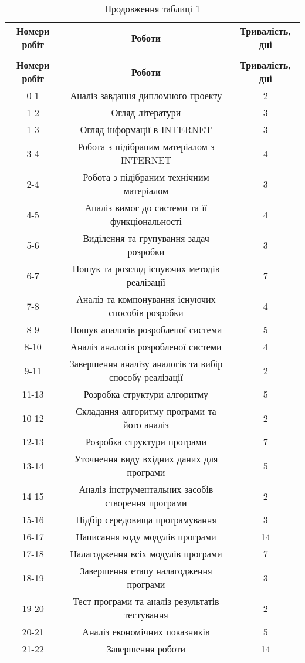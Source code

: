 \begin{center}\footnotesize
\begin{longtable}{|c|c|c|}
\captionsetup{justification=centering}
\caption{Роботи мережевого графа}\label{t:eco_2}\\
\hline
\multicolumn{1}{|c|}{\textbf{Номери робіт}}&
\multicolumn{1}{c|}{\textbf{Роботи}}&
\multicolumn{1}{c|}{\textbf{Тривалість, \newline дні}}\\\hline

\endfirsthead
\caption*{\hfill Продовження таблиці \ref{t:eco_2}}\\\hline

\multicolumn{1}{|c|}{\textbf{Номери робіт}}&
\multicolumn{1}{c|}{\textbf{Роботи}}&
\multicolumn{1}{c|}{\textbf{Тривалість, дні}}\\\hline
\endhead

0-1 & Аналіз завдання дипломного проекту & 2\\ \hline
1-2 & Огляд літератури & 3\\ \hline
1-3 & Огляд інформації в INTERNET & 3\\ \hline
3-4 & Робота з підібраним матеріалом з INTERNET & 4\\ \hline
2-4 & Робота з підібраним технічним матеріалом & 3\\ \hline
4-5 & Аналіз вимог до системи та її функціональності & 4\\ \hline
5-6 & Виділення та групування задач розробки & 3\\ \hline
6-7 & Пошук та розгляд існуючих методів реалізації & 7\\ \hline
7-8 & Аналіз та компонування існуючих способів розробки & 4\\ \hline
8-9 & Пошук аналогів розробленої системи & 5\\ \hline
8-10 & Аналіз аналогів розробленої системи & 4\\ \hline
9-11 & Завершення аналізу аналогів та вибір способу реалізації & 2\\ \hline
11-13 & Розробка структури алгоритму & 5\\ \hline
10-12 & Складання алгоритму програми та його аналіз & 2\\ \hline
12-13 & Розробка структури програми & 7\\ \hline
13-14 & Уточнення виду вхідних даних для програми & 5\\ \hline
14-15 & Аналіз інструментальних засобів створення програми & 2\\ \hline
15-16 & Підбір середовища програмування & 3\\ \hline
16-17 & Написання коду модулів програми & 14\\ \hline
17-18 & Налагодження всіх модулів програми & 7\\ \hline
18-19 & Завершення етапу налагодження програми & 3\\ \hline
19-20 & Тест програми та аналіз результатів тестування & 2\\ \hline
20-21 & Аналіз економічних показників & 5\\ \hline
21-22 & Завершення роботи & 14\\ \hline


\end{longtable}
\end{center}
